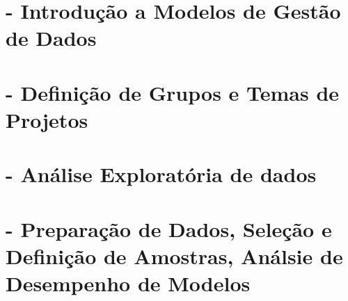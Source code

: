 \documentclass[
]{book}
\begin{document}
\chapter{- Introdução a Modelos de Gestão de Dados}\label{introduuxe7uxe3o-a-modelos-de-gestuxe3o-de-dados}

\chapter{- Definição de Grupos e Temas de Projetos}\label{definiuxe7uxe3o-de-grupos-e-temas-de-projetos}

\chapter{- Análise Exploratória de dados}\label{anuxe1lise-exploratuxf3ria-de-dados}

\chapter{- Preparação de Dados, Seleção e Definição de Amostras, Análsie de Desempenho de Modelos}\label{preparauxe7uxe3o-de-dados-seleuxe7uxe3o-e-definiuxe7uxe3o-de-amostras-anuxe1lsie-de-desempenho-de-modelos}


\end{document}
